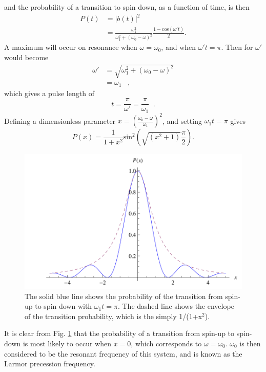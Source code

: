 %
and the probability of a transition to spin down, as a function of
time, is then
%
\begin{equation}
\begin{split}
P(t) &= |b(t)|^2 \\
&=\frac{\omega_1^2}{\omega_{1}^2 + (\omega_0 - \omega)^2}\frac{1- \textrm{cos}(\omega' t)}{2}.
\end{split}
\end{equation}
%
A maximum will occur on resonance when $\omega = \omega_0$, and when
$\omega ' t = \pi$. Then for $\omega'$ would become
%
\begin{equation}
\begin{split}
\omega' &= \sqrt{\omega_{1}^{2} + (\omega_{0}-\omega)^{2}} \\
& = \omega_{1} \;\;\; ,
\end{split}
\end{equation}
%
which gives a pulse length of
\begin{equation}
t = \frac{\pi}{\omega'} =\frac{\pi}{\omega_1} \;\; .
\end{equation}
%
Defining a dimensionless parameter $x = (\frac{\omega_0 - \omega}{\omega_1})^2$, and setting $\omega_1 t = \pi$ gives
%
\begin{equation}
P(x)=\frac{1}{1 + x^2}\textrm{sin}^{2}(\sqrt{(x^2 +1)}\frac{\pi}{2}).
\end{equation}

\begin{figure}[h!]
  \centering \includegraphics[width=1\textwidth]{NMR_Lineshape.png}
  \caption[Probability of spin transition in a static $B_0$ field with
  an RF pulse]{The solid blue line shows the probability of the
    transition from spin-up to spin-down with $\omega_1 t = \pi$.  The
    dashed line shows the envelope of the transition probability,
    which is the simply 1/(1+x$^2$).}
    \label{fig:trans}
\end{figure} 
%
It is clear from Fig. \ref{fig:trans} that the probability of a
transition from spin-up to spin-down is most likely to occur when
$x=0$, which corresponds to $\omega = \omega_0$.  $\omega_0$ is then
considered to be the resonant frequency of this system, and is known
as the Larmor precession frequency.
